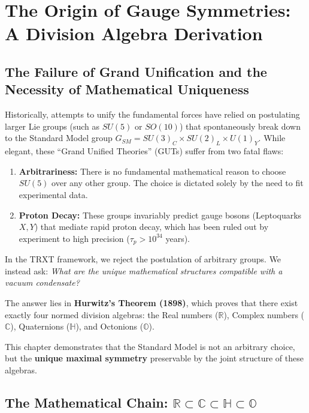

\section{The Origin of Gauge Symmetries: A Division Algebra Derivation}\label{chap:division_algebras}
\label{sec:division_algebras}


\subsection{The Failure of Grand Unification and the Necessity of Mathematical Uniqueness}

Historically, attempts to unify the fundamental forces have relied on postulating larger Lie groups (such as $SU(5)$ or $SO(10)$) that spontaneously break down to the Standard Model group $G_{SM} = SU(3)_C \times SU(2)_L \times U(1)_Y$. While elegant, these ``Grand Unified Theories'' (GUTs) suffer from two fatal flaws:
\begin{enumerate}
    \item \textbf{Arbitrariness:} There is no fundamental mathematical reason to choose $SU(5)$ over any other group. The choice is dictated solely by the need to fit experimental data.
    \item \textbf{Proton Decay:} These groups invariably predict gauge bosons (Leptoquarks $X, Y$) that mediate rapid proton decay, which has been ruled out by experiment to high precision ($\tau_p > 10^{34}$ years).
\end{enumerate}

In the TRXT framework, we reject the postulation of arbitrary groups. We instead ask: \textit{What are the unique mathematical structures compatible with a vacuum condensate?}

The answer lies in \textbf{Hurwitz's Theorem (1898)}, which proves that there exist exactly four normed division algebras: the Real numbers ($\mathbb{R}$), Complex numbers ($\mathbb{C}$), Quaternions ($\mathbb{H}$), and Octonions ($\mathbb{O}$).

This chapter demonstrates that the Standard Model is not an arbitrary choice, but the \textbf{unique maximal symmetry} preservable by the joint structure of these algebras.

\subsection{The Mathematical Chain: $\mathbb{R} \subset \mathbb{C} \subset \mathbb{H} \subset \mathbb{O}$}

